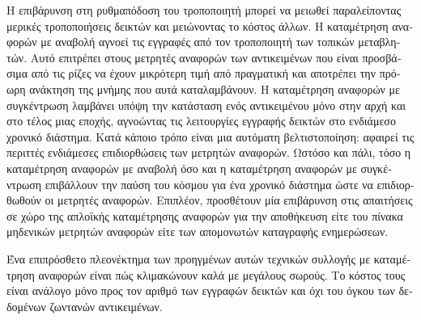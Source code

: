 \begin{greek}
Η επιβάρυνση στη ρυθμαπόδοση του τροποποιητή μπορεί να
μειωθεί παραλείποντας μερικές τροποποιήσεις δεικτών και
μειώνοντας το κόστος άλλων. Η καταμέτρηση αναφορών με
αναβολή αγνοεί τις εγγραφές από τον τροποποιητή των τοπικών
μεταβλητών. Αυτό επιτρέπει στους μετρητές αναφορών των
αντικειμένων που είναι προσβάσιμα από τις ρίζες να έχουν
μικρότερη τιμή από πραγματική και αποτρέπει την πρόωρη
ανάκτηση της μνήμης που αυτά καταλαμβάνουν. Η καταμέτρηση
αναφορών με συγκέντρωση λαμβάνει υπόψη την κατάσταση ενός
αντικειμένου μόνο στην αρχή και στο τέλος μιας εποχής,
αγνοώντας τις λειτουργίες εγγραφής δεικτών στο ενδιάμεσο
χρονικό διάστημα. Κατά κάποιο τρόπο είναι μια αυτόματη
βελτιστοποίηση: αφαιρεί τις περιττές ενδιάμεσες
επιδιορθώσεις των μετρητών αναφορών. Ωστόσο και πάλι,
τόσο η καταμέτρηση αναφορών με αναβολή όσο και η καταμέτρηση
αναφορών με συγκέντρωση επιβάλλουν την παύση του κόσμου
για ένα χρονικό διάστημα ώστε να επιδιορθωθούν οι μετρητές
αναφορών. Επιπλέον, προσθέτουν μία επιβάρυνση στις
απαιτήσεις σε χώρο της απλοϊκής καταμέτρησης αναφορών
για την αποθήκευση είτε του πίνακα μηδενικών μετρητών
αναφορών είτε των απομονωτών καταγραφής ενημερώσεων.

Ένα επιπρόσθετο πλεονέκτημα των προηγμένων αυτών τεχνικών
συλλογής με καταμέτρηση αναφορών είναι πώς κλιμακώνουν
καλά με μεγάλους σωρούς. Το κόστος τους είναι ανάλογο
μόνο προς τον αριθμό των εγγραφών δεικτών και όχι του
όγκου των δεδομένων ζωντανών αντικειμένων.
\end{greek}
